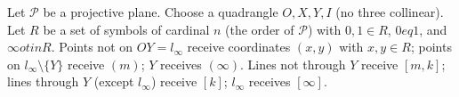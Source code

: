 Let $\mathcal{P}$ be a projective plane. Choose a quadrangle $O, X, Y, I$ (no three collinear). Let $R$ be a set of symbols of cardinal $n$ (the order of $\mathcal{P}$) with $0,1 \in R$, $0 
eq 1$, and $\infty 
otin R$. Points not on $OY = l_\infty$ receive coordinates $(x,y)$ with $x,y \in R$; points on $l_\infty \setminus \{Y\}$ receive $(m)$; $Y$ receives $(\infty)$. Lines not through $Y$ receive $[m,k]$; lines through $Y$ (except $l_\infty$) receive $[k]$; $l_\infty$ receives $[\infty]$.
